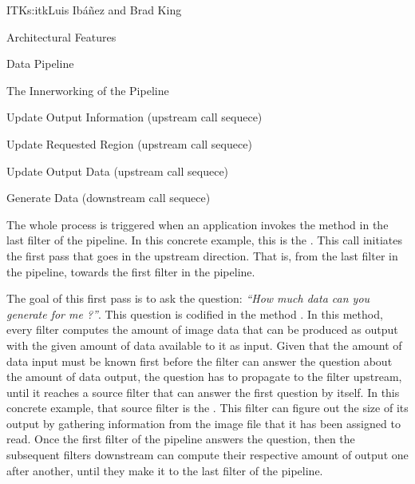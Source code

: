 \begin{aosachapter}{ITK}{s:itk}{Luis Ib\'{a}\~{n}ez and Brad King}
\begin{aosasect1}{Architectural Features}
\begin{aosasect2}{Data Pipeline}
\begin{aosasect3}{The Innerworking of the Pipeline}
\begin{aosaitemize}
\item Update Output Information (upstream call sequece)
\item Update Requested Region (upstream call sequece)
\item Update Output Data (upstream call sequece)
\item Generate Data (downstream call sequece)
\end{aosaitemize}

The whole process is triggered when an application invokes the 
method in the last filter of the pipeline. In this concrete example, this is
the . This  call initiates the first pass
that goes in the upstream direction. That is, from the last filter in the
pipeline, towards the first filter in the pipeline.

The goal of this first pass is to ask the question: \emph{``How much data can
you generate for me ?''}. This question is codified in the method
. In this method, every filter computes the
amount of image data that can be produced as output with the given amount of
data available to it as input. Given that the amount of data input must be
known first before the filter can answer the question about the amount of data
output, the question has to propagate to the filter upstream, until it reaches
a source filter that can answer the first question by itself. In this concrete
example, that source filter is the . This filter can
figure out the size of its output by gathering information from the image file
that it has been assigned to read. Once the first filter of the pipeline
answers the question, then the subsequent filters downstream can compute their
respective amount of output one after another, until they make it to the last
filter of the pipeline.


\end{aosasect3}
\end{aosasect2}
\end{aosasect1}
\end{aosachapter}
